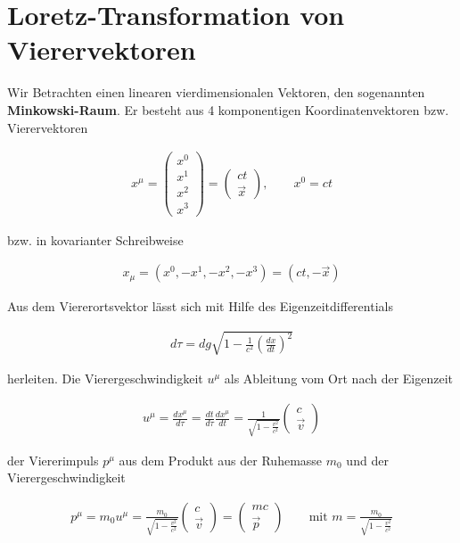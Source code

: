 
\usepackage{amsmath} 





\section*{Loretz-Transformation von Vierervektoren}


Wir Betrachten einen linearen vierdimensionalen Vektoren, den sogenannten  \textbf{Minkowski-Raum}. Er besteht aus 4 komponentigen Koordinatenvektoren bzw. Vierervektoren

\begin{align}
  \label{eq:1}
  x^\mu = \begin{pmatrix}x^0\\x^1\\ x^2\\x^3 \end{pmatrix} = \begin{pmatrix}ct \\\vec x \end{pmatrix}, \qquad x^0=ct
\end{align}

bzw. in kovarianter Schreibweise

\begin{align}
  \label{eq:2}
  x_\mu = (x^0,-x^1,-x^2,-x^3) = (ct,-\vec x)
\end{align}

Aus dem Viererortsvektor lässt sich mit Hilfe des Eigenzeitdifferentials

\begin{align}
  \label{eq:7}
  d\tau = dg\sqrt{1-\frac{1}{c^2}\left(\frac{dx}{dt}\right)^2}
\end{align}

herleiten. Die Vierergeschwindigkeit \(u^\mu\) als Ableitung vom Ort nach der Eigenzeit

\begin{align}
  \label{eq:8}
  u^\mu = \frac{dx^\mu}{d\tau} = \frac{dt}{d\tau}\frac{dx^\mu}{dt}=\frac{1}{\sqrt{1-\frac{v^2}{c^2}}}\begin{pmatrix}c\\\vec v \end{pmatrix}
\end{align}

der Viererimpuls \(p^\mu\) aus dem Produkt aus der Ruhemasse \(m_0\) und der Vierergeschwindigkeit

\begin{align}
  \label{eq:9}
  p^\mu = m_0u^\mu = \frac{m_0}{\sqrt{1-\frac{v^2}{c^2}}}\begin{pmatrix}c\\\vec v \end{pmatrix} =\begin{pmatrix}mc\\\vec p \end{pmatrix}\qquad \text{mit }m= \frac{m_0}{\sqrt{1-\frac{v^2}{c^2}}}
\end{align}

